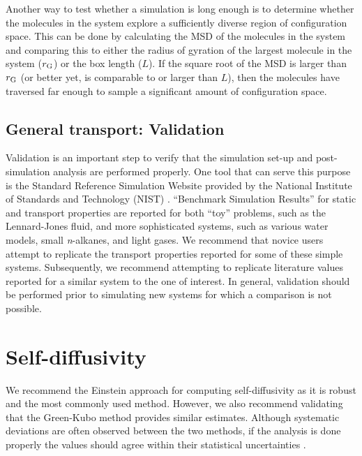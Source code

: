 \documentclass[9pt,bestpractices]{livecoms}
\begin{document}
Another way to test whether a simulation is long enough is to determine whether the molecules in the system explore a sufficiently diverse region of configuration space. This can be done by calculating the MSD of the molecules in the system and comparing this to either the radius of gyration of the largest molecule in the system ($r_{\rm G}$) or the box length ($L$). If the square root of the MSD is larger than $r_{\rm G}$ (or better yet, is comparable to or larger than $L$), then the molecules have traversed far enough to sample a significant amount of configuration space.


\subsection{General transport: Validation} \label{sec:General: Validation}

Validation is an important step to verify that the simulation set-up and post-simulation analysis are performed properly. One tool that can serve this purpose is the Standard Reference Simulation Website provided by the National Institute of Standards and Technology (NIST) \cite{ShenSRSW}. ``Benchmark Simulation Results'' for static and transport properties are reported for both ``toy'' problems, such as the Lennard-Jones fluid, and more sophisticated systems, such as various water models, small \textit{n}-alkanes, and light gases. We recommend that novice users attempt to replicate the transport properties reported for some of these simple systems. Subsequently, we recommend attempting to replicate literature values reported for a similar system to the one of interest. In general, validation should be performed prior to simulating new systems for which a comparison is not possible.

\section{Self-diffusivity} \label{sec:Self-Diffusivity}

We recommend the Einstein approach for computing self-diffusivity as it is robust and the most commonly used method. However, we also recommend validating that the Green-Kubo method provides similar estimates. Although systematic deviations are often observed between the two methods, if the analysis is done properly the values should agree within their statistical uncertainties \cite{Kondratyuk2016,Liu2012,Mondello1997}. 
\end{document}
